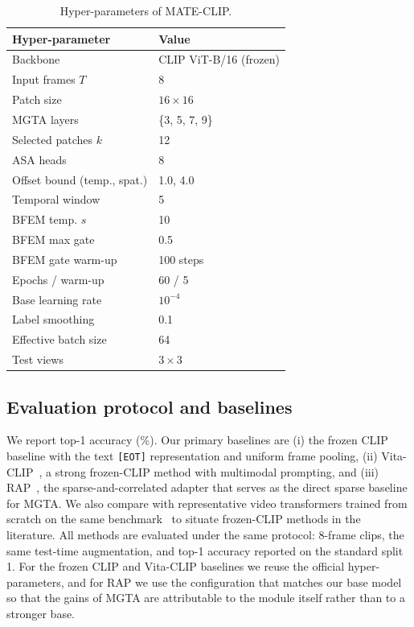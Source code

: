 \begin{table}[t]
  \centering
  \small
  \begin{tabular}{ll}
    \hline
    Hyper-parameter & Value \\
    \hline
    Backbone & CLIP ViT-B/16 (frozen) \\
    Input frames $T$ & 8 \\
    Patch size & $16 \times 16$ \\
    MGTA layers & \{3, 5, 7, 9\} \\
    Selected patches $k$ & 12 \\
    ASA heads & 8 \\
    Offset bound (temp., spat.) & 1.0, 4.0 \\
    Temporal window & 5 \\
    BFEM temp. $s$ & 10 \\
    BFEM max gate & 0.5 \\
    BFEM gate warm-up & 100 steps \\
    Epochs / warm-up & 60 / 5 \\
    Base learning rate & $10^{-4}$ \\
    Label smoothing & 0.1 \\
    Effective batch size & 64 \\
    Test views & $3 \times 3$ \\
    \hline
  \end{tabular}
  \caption{Hyper-parameters of MATE-CLIP.}
  \label{tab:hyper}
\end{table}

\subsection{Evaluation protocol and baselines}
\label{sec:evaluation}
We report top-1 accuracy (\%).
Our primary baselines are (i) the frozen CLIP baseline with the text \texttt{[EOT]} representation and uniform frame pooling, (ii) Vita-CLIP~\cite{wasim2023vitaclip}, a strong frozen-CLIP method with multimodal prompting, and (iii) RAP~\cite{cao2024rap}, the sparse-and-correlated adapter that serves as the direct sparse baseline for MGTA.
We also compare with representative video transformers trained from scratch on the same benchmark~\cite{bertasius2021timesformer,liu2022video_swin,fan2021multiscale} to situate frozen-CLIP methods in the literature.
All methods are evaluated under the same protocol: 8-frame clips, the same test-time augmentation, and top-1 accuracy reported on the standard split 1.
For the frozen CLIP and Vita-CLIP baselines we reuse the official hyper-parameters, and for RAP we use the configuration that matches our base model so that the gains of MGTA are attributable to the module itself rather than to a stronger base.

